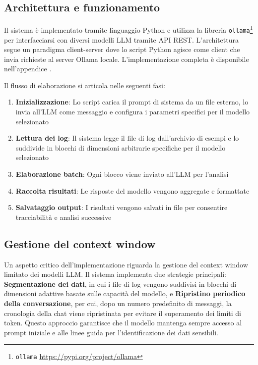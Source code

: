 \documentclass[12pt]{report}
\begin{document}
\subsection{Architettura e funzionamento}
\label{subsec:ver1_architettura}

Il sistema è implementato tramite linguaggio Python e utilizza la libreria \texttt{ollama}\footnote{\texttt{ollama} \url{https://pypi.org/project/ollama}} per interfacciarsi con diversi modelli LLM tramite API REST. L'architettura segue un paradigma client-server dove lo script Python agisce come client che invia richieste al server Ollama locale. L'implementazione completa è disponibile nell'appendice .

Il flusso di elaborazione si articola nelle seguenti fasi:

\begin{enumerate}
    \item \textbf{Inizializzazione}: Lo script carica il prompt di sistema da un file esterno, lo invia all'LLM come messaggio e configura i parametri specifici per il modello selezionato
    \item \textbf{Lettura dei log}: Il sistema legge il file di log dall'archivio di esempi e lo suddivide in blocchi di dimensioni arbitrarie specifiche per il modello selezionato
    \item \textbf{Elaborazione batch}: Ogni blocco viene inviato all'LLM per l'analisi
    \item \textbf{Raccolta risultati}: Le risposte del modello vengono aggregate e formattate
    \item \textbf{Salvataggio output}: I risultati vengono salvati in file per consentire tracciabilità e analisi successive
\end{enumerate}

\subsection{Gestione del context window}
\label{subsec:ver1_context_window}

Un aspetto critico dell'implementazione riguarda la gestione del context window limitato dei modelli LLM. Il sistema implementa due strategie principali: \textbf{Segmentazione dei dati}, in cui i file di log vengono suddivisi in blocchi di dimensioni adattive basate sulle capacità del modello, e \textbf{Ripristino periodico della conversazione}, per cui, dopo un numero predefinito di messaggi, la cronologia della chat viene ripristinata per evitare il superamento dei limiti di token. Questo approccio garantisce che il modello mantenga sempre accesso al prompt iniziale e alle linee guida per l'identificazione dei dati sensibili.
\end{document}
